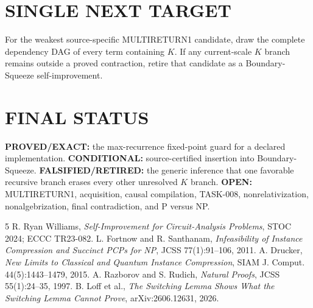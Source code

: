 \documentclass[11pt]{article}
\begin{document}
\section*{SINGLE NEXT TARGET}
For the weakest source-specific MULTIRETURN1 candidate, draw the complete dependency DAG of every term containing $K$. If any current-scale $K$ branch remains outside a proved contraction, retire that candidate as a Boundary-Squeeze self-improvement.

\section*{FINAL STATUS}
\textbf{PROVED/EXACT:} the max-recurrence fixed-point guard for a declared implementation. \textbf{CONDITIONAL:} source-certified insertion into Boundary-Squeeze. \textbf{FALSIFIED/RETIRED:} the generic inference that one favorable recursive branch erases every other unresolved $K$ branch. \textbf{OPEN:} MULTIRETURN1, acquisition, causal compilation, TASK-008, nonrelativization, nonalgebrization, final contradiction, and P versus NP.

\begin{thebibliography}{5}
 R. Ryan Williams, \emph{Self-Improvement for Circuit-Analysis Problems}, STOC 2024; ECCC TR23-082.
 L. Fortnow and R. Santhanam, \emph{Infeasibility of Instance Compression and Succinct PCPs for NP}, JCSS 77(1):91--106, 2011.
 A. Drucker, \emph{New Limits to Classical and Quantum Instance Compression}, SIAM J. Comput. 44(5):1443--1479, 2015.
 A. Razborov and S. Rudich, \emph{Natural Proofs}, JCSS 55(1):24--35, 1997.
 B. Loff et al., \emph{The Switching Lemma Shows What the Switching Lemma Cannot Prove}, arXiv:2606.12631, 2026.
\end{thebibliography}
\end{document}
